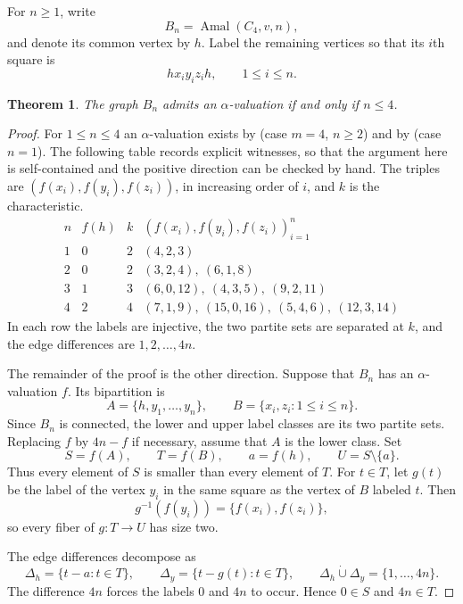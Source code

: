 \documentclass[11pt]{amsart}
\newtheorem{theorem}{Theorem}
\DeclareMathOperator{\Amal}{Amal}
\begin{document}
For $n\ge1$, write
\[
  B_n=\Amal(C_4,v,n),
\]
and denote its common vertex by $h$. Label the remaining vertices so
that its $i$th square is
\[
  h x_i y_i z_i h,\qquad 1\le i\le n.
\]

\begin{theorem}\label{thm:main}
The graph $B_n$ admits an $\alpha$-valuation if and only if $n\le4$.
\end{theorem}

\begin{proof}
For $1\le n\le4$ an $\alpha$-valuation exists by
\cite[Theorem~3.8]{FCIM} (case $m=4$, $n\ge2$) and by \cite{Rosa} (case
$n=1$). The following table records explicit witnesses, so that the
argument here is self-contained and the positive direction can be checked
by hand. The triples are $(f(x_i),f(y_i),f(z_i))$, in increasing order of
$i$, and $k$ is the characteristic.
\[
\begin{array}{c|c|c|l}
 n & f(h) & k & (f(x_i),f(y_i),f(z_i))_{i=1}^{n} \\
\hline
 1 & 0 & 2 & (4,2,3) \\
 2 & 0 & 2 & (3,2,4),\ (6,1,8) \\
 3 & 1 & 3 & (6,0,12),\ (4,3,5),\ (9,2,11) \\
 4 & 2 & 4 & (7,1,9),\ (15,0,16),\ (5,4,6),\ (12,3,14)
\end{array}
\]
In each row the labels are injective, the two partite sets are separated
at $k$, and the edge differences are $1,2,\dots,4n$.

The remainder of the proof is the other direction. Suppose that $B_n$ has
an $\alpha$-valuation $f$. Its bipartition is
\[
  A=\{h,y_1,\dots,y_n\},
  \qquad
  B=\{x_i,z_i:1\le i\le n\}.
\]
Since $B_n$ is connected, the lower and upper label classes are its two
partite sets. Replacing $f$ by $4n-f$ if necessary, assume that $A$ is
the lower class. Set
\[
  S=f(A),\qquad T=f(B),\qquad a=f(h),\qquad U=S\setminus\{a\}.
\]
Thus every element of $S$ is smaller than every element of $T$.
For $t\in T$, let $g(t)$ be the label of the vertex $y_i$ in the same
square as the vertex of $B$ labeled $t$. Then
\[
  g^{-1}(f(y_i))=\{f(x_i),f(z_i)\},
\]
so every fiber of $g\colon T\to U$ has size two.

The edge differences decompose as
\begin{equation}\label{eq:partition}
  \Delta_h=\{t-a:t\in T\},
  \qquad
  \Delta_y=\{t-g(t):t\in T\},
  \qquad
  \Delta_h\mathbin{\dot\cup}\Delta_y=\{1,\dots,4n\}.
\end{equation}
The difference $4n$ forces the labels $0$ and $4n$ to occur. Hence
$0\in S$ and $4n\in T$.


\end{proof}
\end{document}
